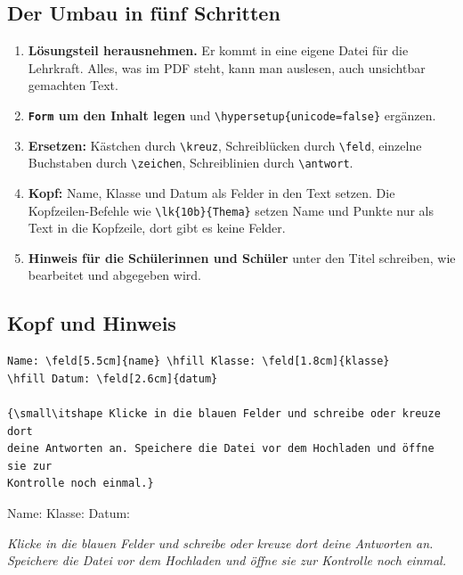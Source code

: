 \begin{Form}
\subsection{Der Umbau in fünf Schritten}

\begin{enumerate}[(1)]
	\item \textbf{Lösungsteil herausnehmen.} Er kommt in eine eigene Datei
	für die Lehrkraft. Alles, was im PDF steht, kann man auslesen, auch
	unsichtbar gemachten Text.
	\item \textbf{\texttt{Form} um den Inhalt legen} und
	\verb|\hypersetup{unicode=false}| ergänzen.
	\item \textbf{Ersetzen:} Kästchen durch \verb|\kreuz|, Schreiblücken durch
	\verb|\feld|, einzelne Buchstaben durch \verb|\zeichen|, Schreiblinien
	durch \verb|\antwort|.
	\item \textbf{Kopf:} Name, Klasse und Datum als Felder in den Text setzen.
	Die Kopfzeilen-Befehle wie \verb|\lk{10b}{Thema}| setzen Name und Punkte
	nur als Text in die Kopfzeile, dort gibt es keine Felder.
	\item \textbf{Hinweis für die Schülerinnen und Schüler} unter den Titel
	schreiben, wie bearbeitet und abgegeben wird.
\end{enumerate}

\subsection{Kopf und Hinweis}

\begin{lstlisting}[style=latex]
Name: \feld[5.5cm]{name} \hfill Klasse: \feld[1.8cm]{klasse}
\hfill Datum: \feld[2.6cm]{datum}

{\small\itshape Klicke in die blauen Felder und schreibe oder kreuze dort
deine Antworten an. Speichere die Datei vor dem Hochladen und öffne sie zur
Kontrolle noch einmal.}
\end{lstlisting}

\begin{ausgabe}
Name:  \hfill Klasse: 
\hfill Datum: 

{\small\itshape Klicke in die blauen Felder und schreibe oder kreuze dort
deine Antworten an. Speichere die Datei vor dem Hochladen und öffne sie zur
Kontrolle noch einmal.}
\end{ausgabe}



\end{Form}
